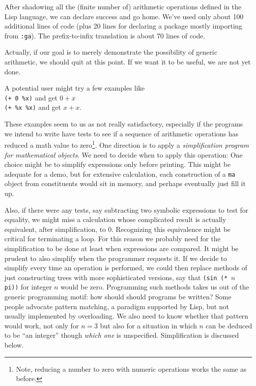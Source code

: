 \documentclass{article}
\begin{document}
{After shadowing all the (finite number of) arithmetic operations
defined in the Lisp language, we can declare success and go home.
We've used only about 100 additional lines of code (plus 20 lines
for declaring a package mostly importing from {\tt :ga}).
The prefix-to-infix translation is about 70 lines of code.

Actually, if our goal is to merely demonstrate the possibility of generic
arithmetic, we should quit at this point.
If we want it to be useful, we are not yet done.  

\medskip

A potential user might try a few examples like\\
{\tt (+ 0 \%x)} and get $0+x$\\
{\tt (+ \%x \%x)} and get $x+x$.

These examples seem to us as not really satisfactory, especially if
the programs we intend to write have tests to see if a sequence of
arithmetic operations has reduced a math value to zero\footnote{Note,
reducing a number to zero with numeric operations works the same as
before.}.  One direction is to apply a {\em simplification program for
mathematical objects}. We need to decide when to apply this operation:
One choice might be to simplify expressions only before printing. This
might be adequate for a demo, but for extensive calculation, each
construction of a {\tt ma} object from constituents would sit in
memory, and perhaps eventually just fill it up.

Also, if there were any tests, say subtracting two symbolic
expressions to test for equality, we might miss a calculation whose
complicated result is actually equivalent, after simplification, to
$0$. Recognizing this equivalence might be critical for terminating a loop.
For this reason we probably need for the simplification to be
done at least when expressions are compared. It might be prudent
to also simplify when the programmer requests it.
If we decide to simplify every time an operation is performed, 
we could then replace methods of just constructing trees with
more sophisticated versions, say that {\tt(sin (* $n$ pi))} for
integer $n$ would be zero.  Programming such methods takes us out of
the generic programming motif: how should should programs
be written? Some people advocate pattern matching, a
paradigm supported by Lisp, but not usually implemented by overloading.
We also need to know whether that
pattern would work, not only for $n=3$ but also for a situation in
which $n$ can be deduced to be ``an integer'' though {\em which one}
is unspecified.  Simplification is discussed below.

}
\end{document}
